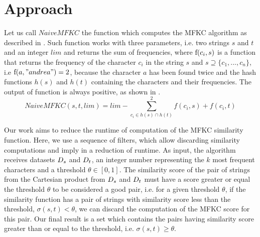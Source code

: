 \section{Approach} \label{mfkc}

Let us call $NaiveMFKC$ the function which computes the MFKC algorithm as described in \cite{seker2014novel}.
Such function works with three parameters, i.e. two strings $s$ and $t$ and an integer $lim$ and returns the sum of frequencies, where $\textnormal{f}(c_i, s)$ is a function that returns the frequency of the character $c_i$ in the string $s$ and $s \supseteq \{c_1,...,c_n\}$, i.e $\textnormal{f}(a,"andrea")=2$, because the character $a$ has been found twice and the hash functions $h(s)$ and $h(t)$ containing the characters and their frequencies. The output of function is always positive, as shown in . 
\begin{equation} \label{eq:naive}
	NaiveMFKC(s, t, lim) = lim - \sum_{c_i \in h(s) \cap h(t)}^2 f(c_i,s) + f(c_i,t)
\end{equation}

Our work aims to reduce the runtime of computation of the MFKC similarity function.
Here, we use a sequence of filters, which allow discarding similarity computations and imply in a reduction of runtime.
As input, the algorithm receives datasets ${D_s}{}$ and ${D_t}{}$, an integer number representing the $k$ most frequent characters and a threshold $\theta \in [0,1]$.
The similarity score of the pair of strings from the Cartesian product from ${D_s}{}$ and ${D_t}{}$ must have a score greater or equal the threshold $\theta$ to be considered a good pair, i.e. 
for a given threshold $\theta$, if the similarity function has a pair of strings with similarity score less than the threshold, $\sigma (s, t) < \theta$, we can discard the computation of the MFKC score for this pair. Our final result is a set which contains the pairs having similarity score greater than or equal to the threshold, i.e. $\sigma(s,t) \geq \theta$.


